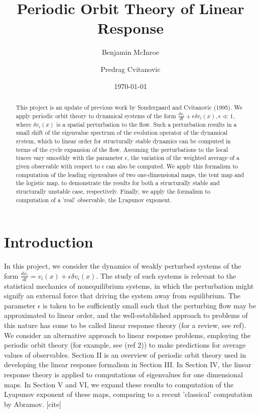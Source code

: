 \documentclass[twocolumn,aip,cha]{revtex4-1}
\begin{document}
\title{Periodic Orbit Theory of Linear Response}
\author{Benjamin McInroe}
\author{Predrag Cvitanovic}

\date{\today}

\begin{abstract}

This project is an update of previous work by Sondergaard and Cvitanovic (1995). We apply periodic orbit theory to dynamical systems of the form $\frac{dx_{i}}{dt}+\epsilon \delta v_{i}(x), \epsilon \ll 1$, where $\delta v_{i}(x)$ is a spatial perturbation to the flow. Such a perturbation results in a small shift of the eigenvalue spectrum of the evolution operator of the dynamical system, which to linear order for structurally stable dynamics can be computed in terms of the cycle expansion of the flow. Assuming the perturbations to the local traces vary smoothly with the parameter $\epsilon$, the variation of the weighted average of a given observable with respect to $\epsilon$ can also be computed. We apply this formalism to computation of the leading eigenvalues of two one-dimensional maps, the tent map and the logistic map, to demonstrate the results for both a structurally stable and structurally unstable case, respectively. Finally, we apply the formalism to computation of a 'real' observable, the Lyapunov exponent.

\end{abstract}

\maketitle



\section{Introduction}

In this project, we consider the dynamics of weakly perturbed systems of the form $\frac{dx_{i}}{dt}=v_{i}(x) + \epsilon \delta v_{i}(x)$. The study of such systems is relevant to the statistical mechanics of nonequilibrium systems, in which the perturbation might signify an external force that driving the system away from equilibrium. The parameter $\epsilon$ is taken to be sufficiently small such that the perturbing flow may be approximated to linear order, and the well-established approach to problems of this nature has come to be called linear response theory (for a review, see ref). We consider an alternative approach to linear response problems, employing the periodic orbit theory (for example, see (ref 2)) to make predictions for average values of observables.  Section II is an overview of periodic orbit theory used in developing the linear response formalism in Section III. In Section IV, the linear response theory is applied to computations of eigenvalues for one dimensional maps. In Section V and VI, we expand these results to computation of the Lyapunov exponent of these maps, comparing to a recent 'classical' computation by Abramov. [cite]
\end{document}
